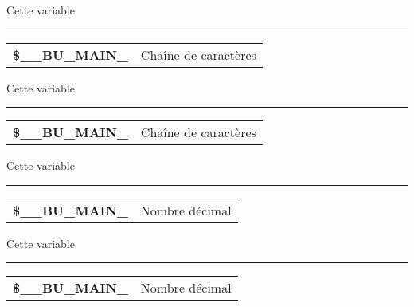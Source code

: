 \documentclass[a4paper,10pt]{article}
\begin{document}
\begin{justify}
    Cette variable
\end{justify}


\par\noindent\rule{\textwidth}{0.4pt}

\begin{justify}
    \begin{tabular}{l|l}
        \textbf{\color{vars}\$\_\_BU\_MAIN\_}  & Chaîne de caractères \\[1\baselineskip]
    \end{tabular}
\end{justify}

\begin{justify}
    Cette variable
\end{justify}


\par\noindent\rule{\textwidth}{0.4pt}

\begin{justify}
    \begin{tabular}{l|l}
        \textbf{\color{vars}\$\_\_BU\_MAIN\_}  & Chaîne de caractères \\[1\baselineskip]
    \end{tabular}
\end{justify}

\begin{justify}
    Cette variable
\end{justify}


\par\noindent\rule{\textwidth}{0.4pt}

\begin{justify}
    \begin{tabular}{l|l}
        \textbf{\color{vars}\$\_\_BU\_MAIN\_}   & Nombre décimal\\[1\baselineskip]
    \end{tabular}
\end{justify}

\begin{justify}
    Cette variable
\end{justify}


\par\noindent\rule{\textwidth}{0.4pt}

\begin{justify}
    \begin{tabular}{l|l}
        \textbf{\color{vars}\$\_\_BU\_MAIN\_}  & Nombre décimal\\[1\baselineskip]
    \end{tabular}
\end{justify}
\end{document}
